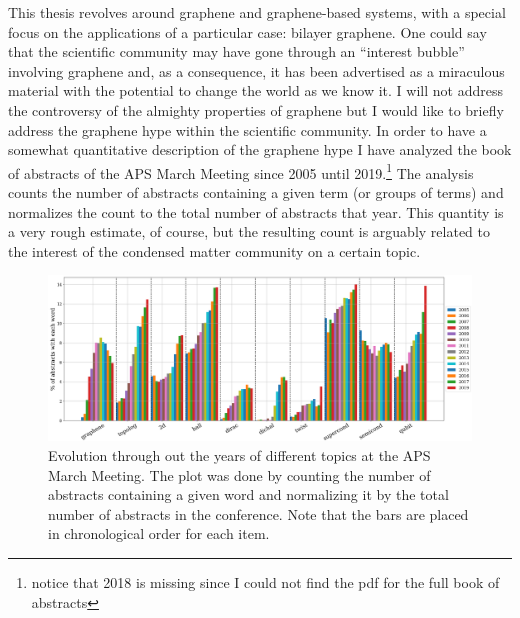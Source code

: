 This thesis revolves around graphene and graphene-based systems, with a special focus on the applications of a particular case: bilayer graphene.
One could say that the scientific community may have gone through an ``interest bubble'' involving graphene and, as a consequence, it has been advertised as a miraculous material with the potential to change the world as we know it. I will not address the controversy of the almighty properties of graphene but I would like to briefly address the graphene hype within the scientific community.
In order to have a somewhat quantitative description of the graphene hype I have analyzed the book of abstracts of the APS March Meeting since 2005 until 2019.\footnote{notice that 2018 is missing since I could not find the pdf for the full book of abstracts}
The analysis counts the number of abstracts containing a given term (or groups of terms) and normalizes the count to the total number of abstracts that year.
This quantity is a very rough estimate, of course, but the resulting count is arguably related to the interest of the condensed matter community on a certain topic.

\begin{figure}[!ht]
\centering
\includegraphics{introduction/figures/topics.png}
\vspace{-20pt}
\caption{Evolution through out the years of different topics at the APS March Meeting. The plot was done by counting the number of abstracts containing a given word and normalizing it by the total number of abstracts in the conference. Note that the bars are placed in chronological order for each item.}
\label{topics}
\end{figure}

